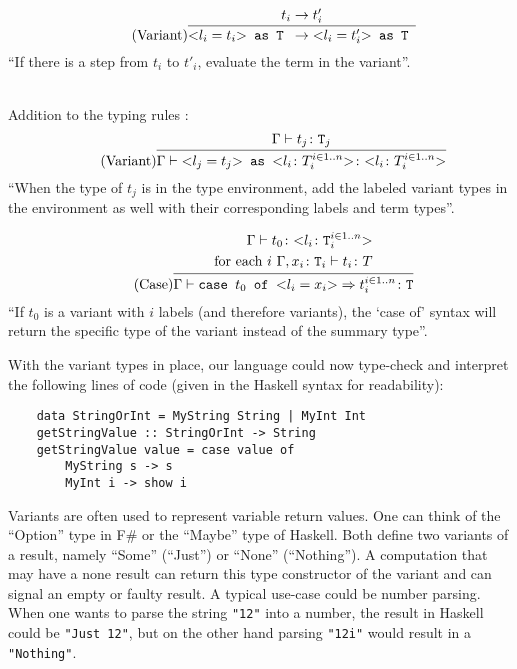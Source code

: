 \begin{equation*}
    \tag{Variant}
    \infer{
        \text{<}l_i=t_i\text{>} \texttt{ as T } \rightarrow \text{<}l_i=t'_i\text{>} \texttt{ as T }
    }{
        t_i \rightarrow t'_i
    }
\end{equation*}
``If there is a step from $t_i$ to $t'_i$, evaluate the term
in the variant''.

~\\
Addition to the typing rules \cite{pierce2002ProgLang}:
\begin{equation*}
    \tag{Variant}
    \infer{
    \Gamma \vdash \text{<}l_j=t_j\text{>} \texttt{ as } \text{<}l_i \colon T_i^{i \in 1..n}\text{>} \colon \text{<}l_i \colon T_i^{i \in 1..n}\text{>}
    }{
    \Gamma \vdash t_j \colon \texttt{T}_j
    }
\end{equation*}
``When the type of $t_j$ is in the type environment, add the labeled
variant types in the environment as well with their corresponding labels and
term types''.

\begin{equation*}
    \tag{Case}
    \infer{
    \Gamma \vdash \texttt{case } t_0 \texttt{ of } \text{<}l_i=x_i\text{>} \Rightarrow t_i^{i \in 1..n} \colon \texttt{T}
    }{
    \begin{split}
        \Gamma \vdash t_0 \colon \text{<}l_i \colon \texttt{T}_i^{i \in 1..n}\text{>} \\
        \text{for each } i \text{    } \Gamma, x_i \colon \texttt{T}_i \vdash t_i \colon T
    \end{split}
    }
\end{equation*}
``If $t_0$ is a variant with $i$ labels (and therefore variants), the `case of' syntax
will return the specific type of the variant instead of the summary type''.

With the variant types in place, our language could now type-check and interpret
the following lines of code (given in the Haskell syntax for readability):

\begin{verbatim}
    data StringOrInt = MyString String | MyInt Int
    getStringValue :: StringOrInt -> String
    getStringValue value = case value of
        MyString s -> s
        MyInt i -> show i
\end{verbatim}

Variants are often used to represent variable return values.
One can think of the ``Option'' type in F\# or the ``Maybe'' type
of Haskell. Both define two variants of a result, namely ``Some'' (``Just'')
or ``None'' (``Nothing''). A computation that may have a none result can return
this type constructor of the variant and can signal an empty or faulty result.
A typical use-case could be number parsing. When one wants to parse the string
\texttt{"12"} into a number, the result in Haskell could be \texttt{"Just 12"}, but
on the other hand parsing \texttt{"12i"} would result in a \texttt{"Nothing"}.

